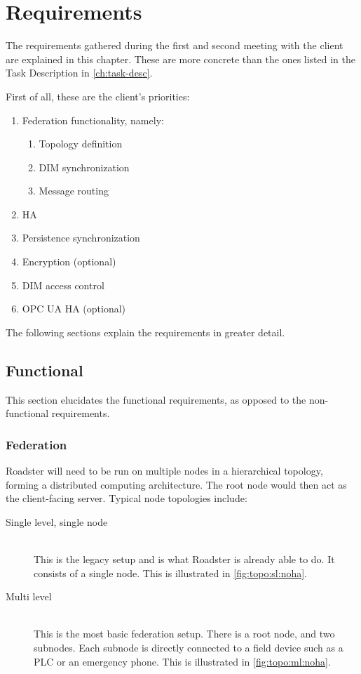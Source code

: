 \chapter{Requirements}
The requirements gathered during the first and second meeting with the client are
explained in this chapter. These are more concrete than the ones listed in the
Task Description in \autoref{ch:task-desc}.

First of all, these are the client's priorities:

\begin{enumerate}
\item Federation functionality, namely:
	\begin{enumerate}
		\item Topology definition
		\item DIM synchronization
		\item Message routing
	\end{enumerate}
\item \Gls{HA}
\item Persistence synchronization
\item Encryption (optional)
\item DIM access control
\item OPC UA \gls{HA} (optional)
\end{enumerate}

The following sections explain the requirements in greater detail.

\section{Functional}
This section elucidates the functional requirements, as opposed to the
non-functional requirements.

\subsection{Federation}
Roadster will need to be run on multiple nodes in a hierarchical topology,
forming a distributed computing architecture. The root node would then act as
the client-facing server. Typical node topologies include:

\begin{description}
	\item [ Single level, single node ] \hfill\\
		This is the legacy setup and is what Roadster is already able
		to do. It consists of a single node. This is illustrated in
		\autoref{fig:topo:sl:noha}.

	\item [ Multi level ] \hfill\\
		This is the most basic federation setup. There is a root node, and
		two subnodes. Each subnode is directly connected to a field device such as a
		PLC or an emergency phone. This is illustrated in
		\autoref{fig:topo:ml:noha}.
\end{description}

